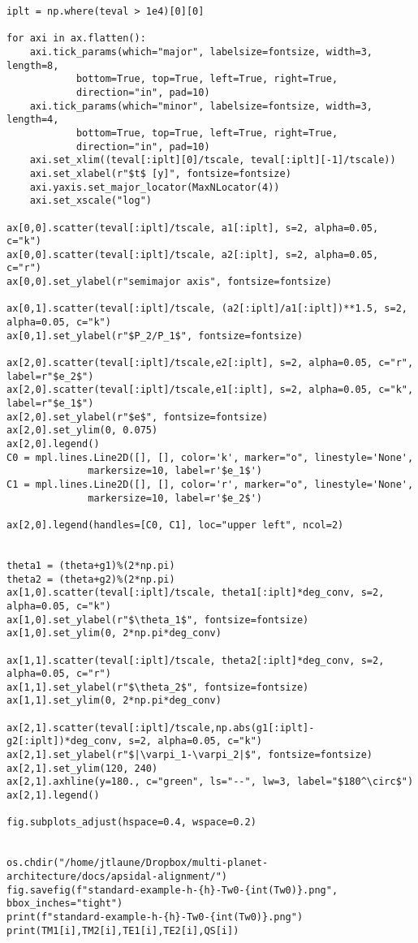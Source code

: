 \documentclass[11pt]{article}
\begin{document}
\begin{verbatim}
iplt = np.where(teval > 1e4)[0][0]

for axi in ax.flatten():
    axi.tick_params(which="major", labelsize=fontsize, width=3, length=8,
		    bottom=True, top=True, left=True, right=True,
		    direction="in", pad=10)
    axi.tick_params(which="minor", labelsize=fontsize, width=3, length=4,
		    bottom=True, top=True, left=True, right=True,
		    direction="in", pad=10)
    axi.set_xlim((teval[:iplt][0]/tscale, teval[:iplt][-1]/tscale))
    axi.set_xlabel(r"$t$ [y]", fontsize=fontsize)
    axi.yaxis.set_major_locator(MaxNLocator(4))
    axi.set_xscale("log")

ax[0,0].scatter(teval[:iplt]/tscale, a1[:iplt], s=2, alpha=0.05, c="k")
ax[0,0].scatter(teval[:iplt]/tscale, a2[:iplt], s=2, alpha=0.05, c="r")
ax[0,0].set_ylabel(r"semimajor axis", fontsize=fontsize)

ax[0,1].scatter(teval[:iplt]/tscale, (a2[:iplt]/a1[:iplt])**1.5, s=2, alpha=0.05, c="k")
ax[0,1].set_ylabel(r"$P_2/P_1$", fontsize=fontsize)

ax[2,0].scatter(teval[:iplt]/tscale,e2[:iplt], s=2, alpha=0.05, c="r", label=r"$e_2$")
ax[2,0].scatter(teval[:iplt]/tscale,e1[:iplt], s=2, alpha=0.05, c="k", label=r"$e_1$")
ax[2,0].set_ylabel(r"$e$", fontsize=fontsize)
ax[2,0].set_ylim(0, 0.075)
ax[2,0].legend()
C0 = mpl.lines.Line2D([], [], color='k', marker="o", linestyle='None',
		      markersize=10, label=r'$e_1$')
C1 = mpl.lines.Line2D([], [], color='r', marker="o", linestyle='None',
		      markersize=10, label=r'$e_2$')

ax[2,0].legend(handles=[C0, C1], loc="upper left", ncol=2)


theta1 = (theta+g1)%(2*np.pi)
theta2 = (theta+g2)%(2*np.pi)
ax[1,0].scatter(teval[:iplt]/tscale, theta1[:iplt]*deg_conv, s=2, alpha=0.05, c="k")
ax[1,0].set_ylabel(r"$\theta_1$", fontsize=fontsize)
ax[1,0].set_ylim(0, 2*np.pi*deg_conv)

ax[1,1].scatter(teval[:iplt]/tscale, theta2[:iplt]*deg_conv, s=2, alpha=0.05, c="r")
ax[1,1].set_ylabel(r"$\theta_2$", fontsize=fontsize)
ax[1,1].set_ylim(0, 2*np.pi*deg_conv)

ax[2,1].scatter(teval[:iplt]/tscale,np.abs(g1[:iplt]-g2[:iplt])*deg_conv, s=2, alpha=0.05, c="k")
ax[2,1].set_ylabel(r"$|\varpi_1-\varpi_2|$", fontsize=fontsize)
ax[2,1].set_ylim(120, 240)
ax[2,1].axhline(y=180., c="green", ls="--", lw=3, label="$180^\circ$")
ax[2,1].legend()

fig.subplots_adjust(hspace=0.4, wspace=0.2)


os.chdir("/home/jtlaune/Dropbox/multi-planet-architecture/docs/apsidal-alignment/")
fig.savefig(f"standard-example-h-{h}-Tw0-{int(Tw0)}.png", bbox_inches="tight")
print(f"standard-example-h-{h}-Tw0-{int(Tw0)}.png")
print(TM1[i],TM2[i],TE1[i],TE2[i],QS[i])
\end{verbatim}
\end{document}
